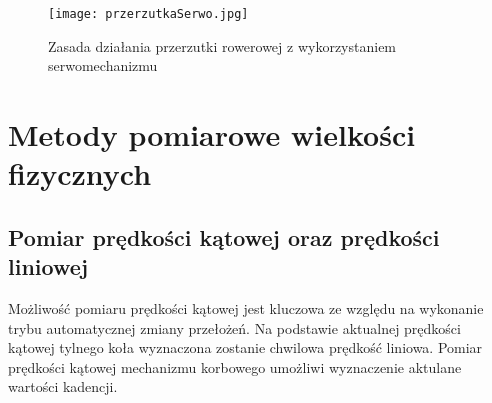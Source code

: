 \begin{figure}[h]
    \centering
    \texttt{[image: przerzutkaSerwo.jpg]}
    \caption{Zasada działania przerzutki rowerowej z wykorzystaniem serwomechanizmu}
    \label{fig:przerzutkaSerwo}
\end{figure}


\section{Metody pomiarowe wielkości fizycznych}
\subsection{Pomiar prędkości kątowej oraz prędkości liniowej}

Możliwość pomiaru prędkości kątowej jest kluczowa ze względu na wykonanie trybu automatycznej zmiany przełożeń. Na podstawie aktualnej prędkości kątowej tylnego koła wyznaczona zostanie chwilowa prędkość liniowa. Pomiar prędkości kątowej mechanizmu korbowego umożliwi wyznaczenie aktulane wartości kadencji.

